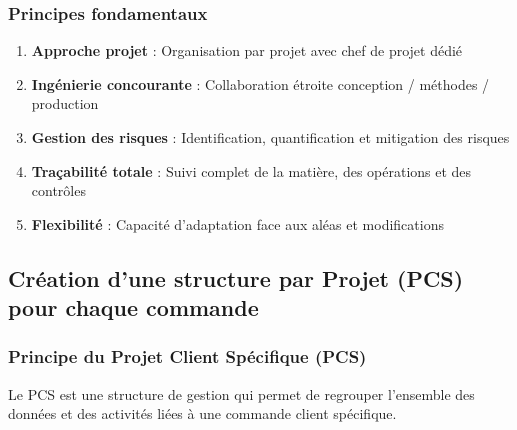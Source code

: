 \documentclass{article}
\begin{document}
\subsubsection{Principes fondamentaux}

\begin{tcolorbox}[colback=vertclair, colframe=green!50!black, title=Principes de la Classe C]
\begin{enumerate}
    \item \textbf{Approche projet} : Organisation par projet avec chef de projet dédié
    \item \textbf{Ingénierie concourante} : Collaboration étroite conception / méthodes / production
    \item \textbf{Gestion des risques} : Identification, quantification et mitigation des risques
    \item \textbf{Traçabilité totale} : Suivi complet de la matière, des opérations et des contrôles
    \item \textbf{Flexibilité} : Capacité d'adaptation face aux aléas et modifications
\end{enumerate}
\end{tcolorbox}

\subsection{Création d'une structure par Projet (PCS) pour chaque commande}

\subsubsection{Principe du Projet Client Spécifique (PCS)}

Le PCS est une structure de gestion qui permet de regrouper l'ensemble des données et des activités liées à une commande client spécifique.
\end{document}
